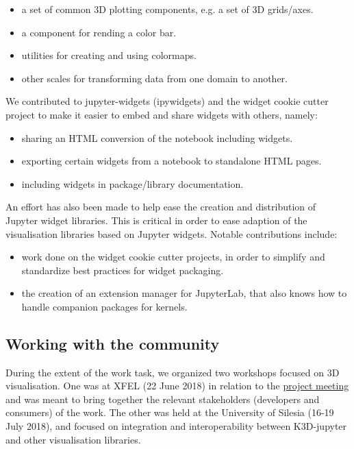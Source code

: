 \documentclass{deliverablereport}
\begin{document}
\begin{itemize}
\item a set of common 3D plotting components, e.g. a set of 3D grids/axes.
\item a component for rending a color bar.
\item utilities for creating and using colormaps.
\item other scales for transforming data from one domain to another.
\end{itemize}


We contributed to jupyter-widgets (ipywidgets) and the widget cookie
cutter project to make it easier to embed and share widgets with
others, namely:

\begin{itemize}
\item sharing an HTML conversion of the notebook including widgets.
\item exporting certain widgets from a notebook to standalone HTML pages.
\item including widgets in package/library documentation.
\end{itemize}

An effort has also been made to help ease the creation and distribution of Jupyter widget libraries. This is critical in order to ease adaption of the visualisation libraries based on Jupyter widgets. Notable contributions include:
\begin{itemize}
\item work done on the widget cookie cutter projects, in order to simplify and standardize best practices for widget packaging.
\item the creation of an extension manager for JupyterLab, that also knows how to handle companion packages for kernels.
\end{itemize}



\subsection{Working with the community}\label{community}

During the extent of the work task, we organized two workshops focused on 3D visualisation.
One was at XFEL (22 June 2018) in relation to the \href{https://opendreamkit.org/2018/06/20/Hamburg-DisseminationWorkshop-SteeringMeeting/}{project meeting} and was meant to bring together the relevant stakeholders (developers and consumers) of the work. The other was held at the University of Silesia (16-19 July 2018), and focused on integration and interoperability between K3D-jupyter and other visualisation libraries.
\end{document}
